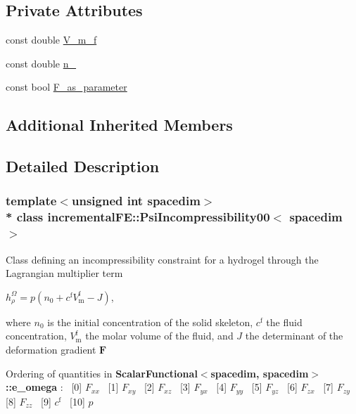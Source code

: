 \subsection*{Private Attributes}
\begin{DoxyCompactItemize}
\item 
const double \hyperlink{classincremental_f_e_1_1_psi_incompressibility00_adb4a98d91d9105e56d71b1c2bbb731fe}{V\+\_\+m\+\_\+f}
\item 
const double \hyperlink{classincremental_f_e_1_1_psi_incompressibility00_a21e9fc511e9410d0fbc9d0514f801f69}{n\+\_}
\item 
const bool \hyperlink{classincremental_f_e_1_1_psi_incompressibility00_aca72a8996f35c7dbd664765af62dec95}{F\+\_\+as\+\_\+parameter}
\end{DoxyCompactItemize}
\subsection*{Additional Inherited Members}


\subsection{Detailed Description}
\subsubsection*{template$<$unsigned int spacedim$>$\\*
class incremental\+F\+E\+::\+Psi\+Incompressibility00$<$ spacedim $>$}

Class defining an incompressibility constraint for a hydrogel through the Lagrangian multiplier term

$h^\Omega_\rho = p\left( n_0 + c^\mathrm{f} V^\mathrm{f}_\mathrm{m} - J \right)$,

where $n_0$ is the initial concentration of the solid skeleton, $c^\mathrm{f}$ the fluid concentration, $V^\mathrm{f}_\mathrm{m}$ the molar volume of the fluid, and $J$ the determinant of the deformation gradient $\boldsymbol{F}$

Ordering of quantities in {\bf Scalar\+Functional$<$spacedim, spacedim$>$\+::e\+\_\+omega} \+:~\newline
 \mbox{[}0\mbox{]} $F_{xx}$~\newline
 \mbox{[}1\mbox{]} $F_{xy}$~\newline
 \mbox{[}2\mbox{]} $F_{xz}$~\newline
 \mbox{[}3\mbox{]} $F_{yx}$~\newline
 \mbox{[}4\mbox{]} $F_{yy}$~\newline
 \mbox{[}5\mbox{]} $F_{yz}$~\newline
 \mbox{[}6\mbox{]} $F_{zx}$~\newline
 \mbox{[}7\mbox{]} $F_{zy}$~\newline
 \mbox{[}8\mbox{]} $F_{zz}$~\newline
 \mbox{[}9\mbox{]} $c^\mathrm{f}$~\newline
 \mbox{[}10\mbox{]} $p$ 

